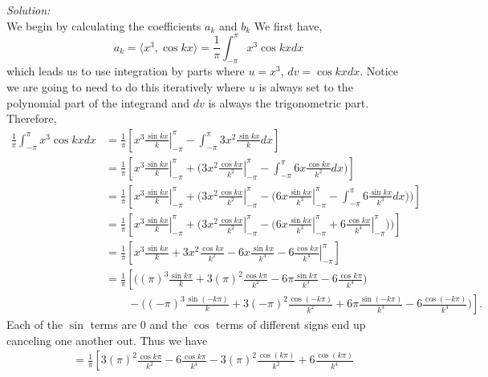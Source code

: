 \documentclass[10pt]{amsart}
\theoremstyle{nonumberplain}
\begin{document}
\begin{enumerate}[label={\bf {\arabic*}:}]
\begin{itemize}
\noindent
\textit{Solution:} \\
We begin by calculating the coefficients $a_k$ and $b_k$
We first have,
$$
a_k = \langle x^3, \cos kx \rangle = \frac 1 \pi \int_{-\pi}^\pi x^3 \cos kx dx
$$
which leads us to use integration by parts where $u = x^3$, $dv = \cos kx dx$.
Notice we are going to need to do this iteratively where $u$ is always set to the polynomial part of the integrand and $dv$ is always the trigonometric part.
Therefore,
\begin{align*}
\frac 1 \pi \int_{-\pi}^\pi x^3 \cos kx dx
	&= \frac 1 \pi\left[ \left. x^3 \frac {\sin k x} k \right|_{-\pi}^\pi - \int_{-\pi}^\pi 3 x^2 \frac {\sin kx} k dx \right] \\
	&= \frac 1 \pi\left[
		\left. x^3 \frac {\sin k x} k \right|_{-\pi}^\pi
		+ \Bigg( \left. 3x^2 \frac {\cos k x} {k^2} \right|_{-\pi}^\pi - \int_{-\pi}^\pi 6 x \frac {\cos kx} {k^2} dx\Bigg)
	\right] \\
	&= \frac 1 \pi\left[
		\left. x^3 \frac {\sin k x} k \right|_{-\pi}^\pi
		+ \Bigg(
			\left. 3x^2 \frac {\cos k x} {k^2} \right|_{-\pi}^\pi
			- \Big( \left. 6x \frac {\sin k x} {k^3} \right|_{-\pi}^\pi - \int_{-\pi}^\pi 6 \frac {\sin k x} {k^3} dx \Big)
		\Bigg)
	\right] \\
	&= \frac 1 \pi\left[
		\left. x^3 \frac {\sin k x} k \right|_{-\pi}^\pi
		+ \Bigg(
			\left. 3x^2 \frac {\cos k x} {k^2} \right|_{-\pi}^\pi
			- \Big( \left. 6x \frac {\sin k x} {k^3} \right|_{-\pi}^\pi + \left. 6 \frac {\cos k x} {k^4} \right|_{-\pi}^\pi \Big)
		\Bigg)
	\right] \\
	&= \frac 1 \pi \left[ \left.
		x^3 \frac {\sin k x} k + 3x^2 \frac {\cos k x} {k^2} - 6x \frac {\sin k x} {k^3} - 6 \frac {\cos k x} {k^4} \right|_{-\pi}^\pi
	\right] \\
	&= \frac 1 \pi \left[
		\Bigg( (\pi)^3 \frac {\sin k \pi} k + 3(\pi)^2 \frac {\cos k \pi} {k^2} - 6\pi \frac {\sin k \pi} {k^3} - 6 \frac {\cos k \pi} {k^4} \Bigg) \right. \\
		&\quad\quad- \left. \Bigg( (-\pi)^3 \frac {\sin (- k \pi) } k + 3(-\pi)^2 \frac {\cos (- k \pi)} {k^2} + 6\pi \frac {\sin (- k \pi)} {k^3} - 6 \frac {\cos (- k \pi)} {k^4} \Bigg)
	\right].
\end{align*}
Each of the $\sin$ terms are 0 and the $\cos$ terms of different signs end up canceling one another out.
Thus we have
\begin{align*}
&= \frac 1 \pi \left[
		3(\pi)^2 \frac {\cos k \pi} {k^2} - 6 \frac {\cos k \pi} {k^4} - 3(\pi)^2 \frac {\cos (k \pi)} {k^2} + 6 \frac {\cos (k \pi)} {k^4}

\end{align*}
\end{itemize}
\end{enumerate}
\end{document}
